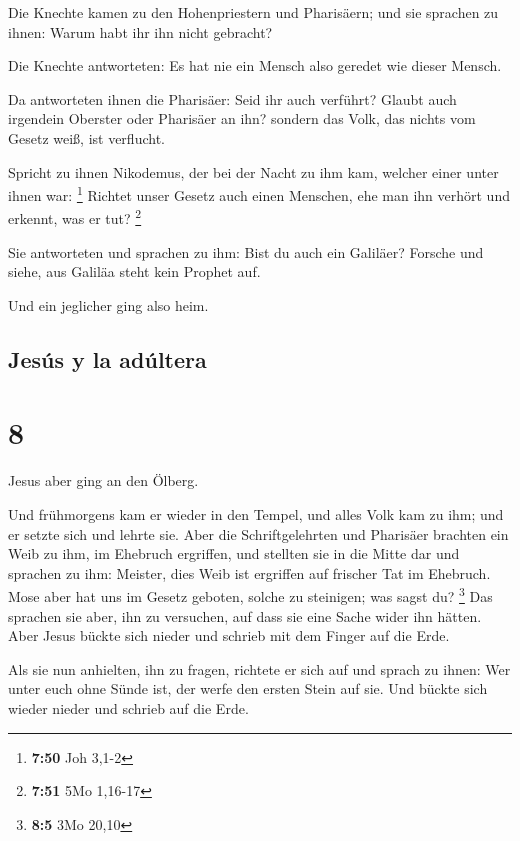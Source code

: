 Die Knechte kamen zu den Hohenpriestern und Pharisäern;
und sie sprachen zu ihnen: Warum habt ihr ihn nicht gebracht?

 Die Knechte antworteten: Es hat nie ein Mensch also
geredet wie dieser Mensch.

 Da antworteten ihnen die Pharisäer: Seid ihr auch
verführt?  Glaubt auch irgendein Oberster oder Pharisäer
an ihn?  sondern das Volk, das nichts vom Gesetz weiß,
ist verflucht.

 Spricht zu ihnen Nikodemus, der bei der Nacht zu ihm
kam, welcher einer unter ihnen war: \footnote{\textbf{7:50} Joh 3,1-2}
 Richtet unser Gesetz auch einen Menschen, ehe man ihn
verhört und erkennt, was er tut? \footnote{\textbf{7:51} 5Mo 1,16-17}

 Sie antworteten und sprachen zu ihm: Bist du auch ein
Galiläer? Forsche und siehe, aus Galiläa steht kein Prophet auf.

 Und ein jeglicher ging also heim.

\hypertarget{jesuxfas-y-la-aduxfaltera}{%
\subsection{Jesús y la adúltera}\label{jesuxfas-y-la-aduxfaltera}}

\hypertarget{section-7}{%
\section{8}\label{section-7}}

 Jesus aber ging an den Ölberg.

 Und frühmorgens kam er wieder in den Tempel, und alles
Volk kam zu ihm; und er setzte sich und lehrte sie.  Aber
die Schriftgelehrten und Pharisäer brachten ein Weib zu ihm, im Ehebruch
ergriffen, und stellten sie in die Mitte dar  und sprachen
zu ihm: Meister, dies Weib ist ergriffen auf frischer Tat im Ehebruch.
 Mose aber hat uns im Gesetz geboten, solche zu steinigen;
was sagst du? \footnote{\textbf{8:5} 3Mo 20,10}  Das
sprachen sie aber, ihn zu versuchen, auf dass sie eine Sache wider ihn
hätten. Aber Jesus bückte sich nieder und schrieb mit dem Finger auf die
Erde.

 Als sie nun anhielten, ihn zu fragen, richtete er sich
auf und sprach zu ihnen: Wer unter euch ohne Sünde ist, der werfe den
ersten Stein auf sie.  Und bückte sich wieder nieder und
schrieb auf die Erde.

